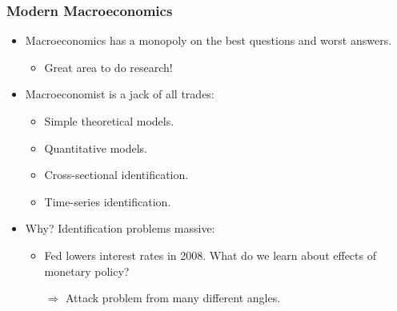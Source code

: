 \documentclass[english,xcolor=svgnames]{beamer}
\begin{document}




\begin{frame}
\frametitle[alignment=center]{Modern Macroeconomics}
\begin{itemize}
		\item Macroeconomics has a monopoly on the best questions and worst answers.
	\begin{itemize}
		\item Great area to do research!
	\end{itemize}
	\item Macroeconomist is a jack of all trades:
	\begin{itemize}
		\item Simple theoretical models.
		\item Quantitative models.
		\item Cross-sectional identification.
		\item Time-series identification.
	\end{itemize}
	\item Why? Identification problems massive:
	\begin{itemize}
		\item Fed lowers interest rates in 2008. What do we learn about effects of monetary policy?
		\item[$\Rightarrow$] Attack problem from many different angles.
	\end{itemize}
\end{itemize}
\end{frame}
\end{document}
